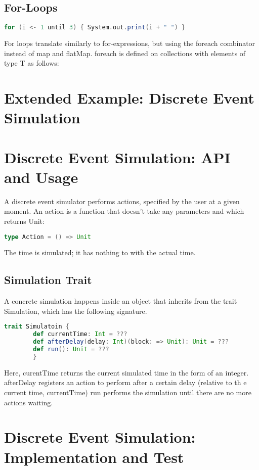 \documentclass[10pt, a4paper]{report}
\begin{document}
\subsection{For-Loops}
\begin{lstlisting}[language=scala]
	for (i <- 1 until 3) { System.out.print(i + " ") }
\end{lstlisting}

For loops translate similarly to for-expressions, but using the foreach combinator instead of map and flatMap. foreach is defined on collections with elements of type T as follows:

\section{Extended Example: Discrete Event Simulation}

\section{Discrete Event Simulation: API and Usage}
A discrete event simulator performs actions, specified by the user at a given moment. An action is a function that doesn't take any parameters and which returns Unit:

\begin{lstlisting}[language=scala]
	type Action = () => Unit
\end{lstlisting}

The time is simulated; it has nothing to with the actual time.

\subsection*{Simulation Trait}

A concrete simulation happens inside an object that inherits from the trait Simulation, which has the following signature.

\begin{lstlisting}[language=scala]
	trait Simulatoin {
		def currentTime: Int = ???
		def afterDelay(delay: Int)(block: => Unit): Unit = ???
		def run(): Unit = ???
		}
\end{lstlisting}
Here, curentTime returns the current simulated time in the form of an integer. afterDelay registers an action to perform after a certain delay (relative to th e current time, currentTime) run performs the simulation until there are no more actions waiting.


\section{Discrete Event Simulation: Implementation and Test}
\end{document}
